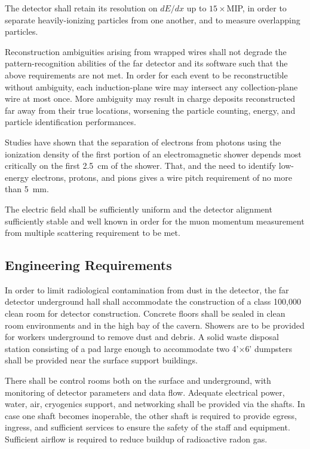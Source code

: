 The detector shall retain its resolution on $dE/dx$ up to $15\times
$MIP, in order to separate heavily-ionizing particles from one
another, and to measure overlapping particles.

Reconstruction ambiguities arising from wrapped wires shall not
degrade the pattern-recognition abilities of the far detector and its
software such that the above requirements are not met.  In order for
each event to be reconstructible without ambiguity, each
induction-plane wire may intersect any collection-plane wire at most
once.  More ambiguity may result in charge deposits reconstructed far
away from their true locations, worsening the particle counting,
energy, and particle identification performances.

Studies have shown that the separation of electrons from photons
using the ionization density of the first portion of an electromagnetic shower
depends most critically on the first 2.5~cm of the shower.  That, and the need
to identify low-energy electrons, protons, and pions gives a wire pitch
requirement of no more than 5~mm.

The electric field shall be sufficiently uniform and the detector alignment
sufficiently stable and well known in order for the muon momentum measurement
from multiple scattering requirement to be met.

\subsection{Engineering Requirements}


In order to limit radiological contamination from dust in the detector, the far detector underground hall shall
accommodate the construction of a class 100,000 clean room for detector
construction.   Concrete floors shall be sealed in %
clean room environments
and in the high bay of the cavern.  Showers are to be provided for workers underground
to remove dust and debris.  A solid waste disposal station consisting of a pad
large enough to accommodate two 4'$\times$6' dumpsters shall be provided near
the surface support buildings.

There shall be control rooms both on the surface and underground, with monitoring
of detector parameters and data flow.  Adequate electrical power, water, air,
cryogenics support, and networking shall be provided via the shafts.   In case
one shaft becomes inoperable, the other shaft is required to provide egress, ingress,
and sufficient services to ensure the safety of the staff and equipment.
Sufficient airflow is required to reduce buildup of radioactive radon gas.

